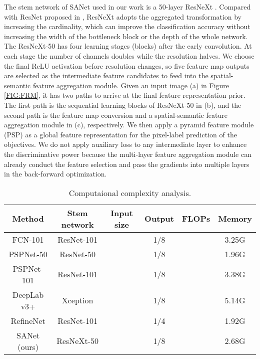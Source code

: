 \documentclass[10pt,twocolumn,twoside]{IEEEtran}
\begin{document}
The stem network of SANet used in our work is a 50-layer ResNeXt \cite{CVPR17:RESNEXT}. Compared with ResNet proposed in \cite{CVPR16:RESNET}, ResNeXt adopts the aggregated transformation by increasing the cardinality, which can improve the classification accuracy without increasing the width of the bottleneck block or the depth of the whole network. The ResNeXt-50 has four learning stages (blocks) after the early convolution. At each stage the number of channels doubles while the resolution halves. We choose the final ReLU activation before resolution changes, so five feature map outputs are selected as the intermediate feature candidates to feed into the spatial-semantic feature aggregation module. Given an input image (a) in Figure \ref{FIG:FRM}, it has two paths to arrive at the final feature representation prior. The first path is the sequential learning blocks of ResNeXt-50 in (b), and the second path is the feature map conversion and a spatial-semantic feature aggregation module in (c), respectively. We then apply a pyramid feature module (PSP) \cite{CVPR17:PSPNET} as a global feature representation for the pixel-label prediction of the objectives. We do not apply auxiliary loss to any intermediate layer to enhance the discriminative power because the multi-layer feature aggregation module can already conduct the feature selection and pass the gradients into multiple layers in the back-forward optimization.

\begin{table*}[t!]
\centering 
\caption{Computaional complexity analysis.}
\label{TB:FLOPS}
\begin{tabular}{|c||c|c|c|c|c|}
\hline
{\bf Method}	& {\bf Stem network}	& {\bf Input size}	& {\bf Output} 	& {\bf FLOPs} & {\bf Memory}\\
\hline
FCN-101    & ResNet-101  &  & 1/8	&  &   3.25G \\
PSPNet-50 \cite{CVPR17:PSPNET}   & ResNet-50  &   & 1/8	&   & 1.96G  \\
PSPNet-101 \cite{CVPR17:PSPNET}    & ResNet-101  &    & 1/8	&  & 3.38G  \\
DeepLab v3+ \cite{TPAMI:DEEPLAB}	& Xception  &    & 1/8	&   & 5.14G  \\
RefineNet \cite{CVPR17:REFINENET}	& ResNet-101  &  & 1/4	&  & 1.92G  \\
SANet (ours)	& ResNeXt-50	&  & 1/8	&    & 2.68G  \\
\hline
\end{tabular}
\end{table*}
\end{document}
